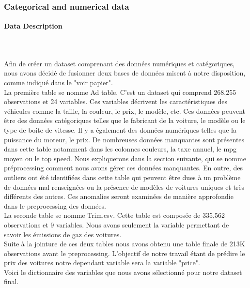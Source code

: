 \documentclass[12pt]{article}
\begin{document}
\subsubsection{Categorical and numerical data}

\paragraph{Data Description}
~~\\
\\
Afin de créer un dataset comprenant des données numériques et catégoriques, nous avons décidé de fusionner deux bases de données misent à notre  disposition, comme indiqué dans le "voir papier". \\

\noindent La première table se nomme Ad table. C'est un dataset qui comprend 268,255 observations et 24 variables. Ces variables décrivent les caractéristiques des véhicules comme la taille, la couleur, le prix, le modèle, etc. Ces données peuvent être des données catégoriques telles que le fabricant de la voiture, le modèle ou le type de boite de vitesse. Il y a également des données numériques telles que la puissance du moteur, le prix. De nombreuses données manquantes sont présentes dans cette table notamment dans les colonnes couleurs, la taxe annuel, le mpg moyen ou le top speed. Nous expliquerons dans la section suivante, qui se nomme préprocessing comment nous avons gérer ces données manquantes. En outre, des outliers ont été identifiées dans cette table qui peuvent être dues à un problème de données mal renseignées ou la présence de modèles de voitures uniques et très différents des autres. Ces anomalies seront examinées de manière approfondie dans le preprocessing des données. \\

\noindent La seconde table se nomme Trim.csv. Cette table est composée de 335,562 observations et 9 variables. Nous avons seulement la variable permettant de savoir les émissions de gaz des voitures. \\

\noindent Suite à la jointure de ces deux tables nous avons obtenu une table finale de 213K observations avant le preprocessing. L'objectif de notre travail étant de prédire le prix des voitures notre dependant variable sera la variable "price". \\

\noindent Voici le dictionnaire des variables que nous avons sélectionné pour notre dataset final.
\end{document}
